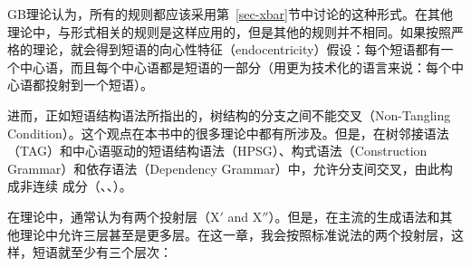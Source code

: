 GB理论认为，所有的规则都应该采用第~\ref{sec-xbar}节中讨论的\xbar 这种形式。在其他理论中，与\xbar 形式相关的规则是这样应用的，但是其他的规则并不相同。如果按照严格的\xbar 理论，就会得到短语的向心性特征（endocentricity）假设：每个短语都有一个中心语，而且每个中心语都是短语的一部分（用更为技术化的语言来说：每个中心语都投射到一个短语）。

进而，正如短语结构语法所指出的，树结构的分支之间不能交叉（Non-Tangling Condition）。这个观点在本书中的很多理论中都有所涉及。但是，在树邻接语法\indextag（TAG）和中心语驱动的短语结构语法\indexhpsg（HPSG）、构式语法\indexcxg（Construction Grammar）和依存语法\indexdg （Dependency Grammar）中，允许分支间交叉，由此构成非连续 成分（\citealp*{BJR91a,Reape94a,BC2005a}、\citealp[]{Heringer96a-u}、\citealp[Section~9.6.2]{Eroms2000a}）。

在\xbar 理论中，通常认为有两个投射层（X$'$ and X$''$）。但是，在主流的生成语法和其他理论中允许三层甚至是更多层\citep{Jackendoff77,Uszkoreit87a}。在这一章，我会按照标准说法的两个投射层，这样，短语就至少有三个层次：

